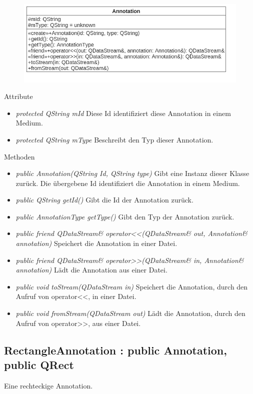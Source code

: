 \begin{figure}[H]
\centering
\includegraphics[scale=0.5]{img/Klassendiagramm/Klassen/Model/Annotation}
\label{fig:annotation}
\end{figure}

Attribute
\begin{itemize}
\item\textit{protected QString mId} Diese Id identifiziert diese \gls{Annotation} in einem  Medium.
\item\textit{protected QString mType} Beschreibt den Typ dieser \gls{Annotation}.
\end{itemize}

Methoden
\begin{itemize}
\item \textit{public Annotation(QString Id, QString type)} Gibt eine Instanz dieser Klasse zurück. Die übergebene Id identifiziert die \gls{Annotation} in einem Medium.
\item \textit{public QString getId()} Gibt die Id der \gls{Annotation} zurück.
\item \textit{public AnnotationType getType()} Gibt den Typ der \gls{Annotation} zurück.
\item \textit{public friend QDataStream\& operator<<(QDataStream\& out, Annotation\& annotation)} Speichert die \gls{Annotation} in einer Datei.
\item \textit{public friend QDataStream\& operator>>(QDataStream\& in, Annotation\& annotation)} Lädt die \gls{Annotation} aus einer Datei.
\item \textit{public void toStream(QDataStream in)} Speichert die \gls{Annotation}, durch den Aufruf von operator<<, in einer Datei.
\item \textit{public void fromStream(QDataStream out)} Lädt die \gls{Annotation}, durch den Aufruf von operator>>, aus einer Datei.
\end{itemize}

\subsection*{RectangleAnnotation : public Annotation, public QRect}
Eine rechteckige \gls{Annotation}.

